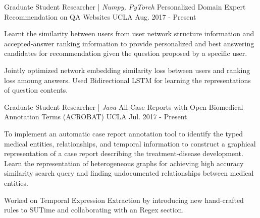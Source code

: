 \begin{cventries}
  \cventry
    {Graduate Student Researcher | \textit{Numpy, PyTorch}}
    {Personalized Domain Expert Recommendation on QA Websites}
    {UCLA}
    {Aug. 2017 - Present}
    {
    	\begin{cvitems}
    		\item {Learnt the similarity between users from user network structure information and accepted-answer ranking information to provide personalized and best answering candidates for recommendation given the question proposed by a specific user.}
    		\item {Jointly optimized network embedding similarity loss between users and ranking loss amoung answers. Used Bidirectional LSTM for learning the representations of question contents.}
    	\end{cvitems}
    }

\vspace{-1em}

  \cventry
    {Graduate Student Researcher | \textit{Java}}
    {All Case Reports with Open Biomedical Annotation Terms (ACROBAT)}
    {UCLA}
    {Jul. 2017 - Present}
    {
    	\begin{cvitems}
			\item {To implement an automatic case report annotation tool to identify the typed  medical entities, relationships, and temporal information to construct a graphical representation of a case report describing the treatment-disease development. Learn the representation of heterogeneous graphs for achieving high accuracy similarity search query and finding undocumented relationships between medical entities.}
			\item {Worked on Temporal Expression Extraction by introducing new hand-crafted rules to SUTime and collaborating with an Regex section.}
    	\end{cvitems}
    }

\vspace{-1.2em}


\end{cventries}
